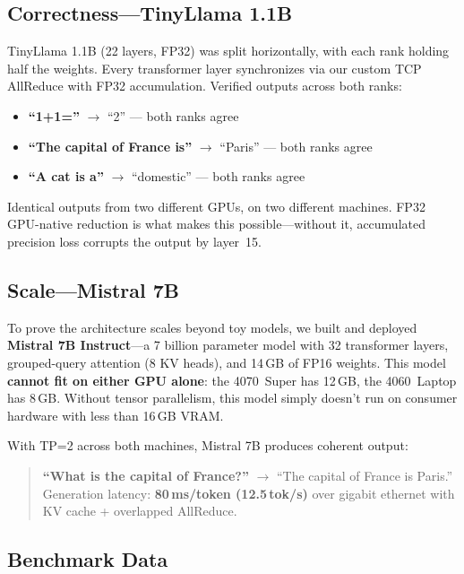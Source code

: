 \documentclass[10pt,twocolumn]{article}
\begin{document}
\subsection{Correctness---TinyLlama 1.1B}

TinyLlama 1.1B (22 layers, FP32) was split horizontally, with each rank
holding half the weights.  Every transformer layer synchronizes via our
custom TCP AllReduce with FP32 accumulation.  Verified outputs across both
ranks:

\begin{itemize}[nosep,leftmargin=*]
  \item \textbf{``1+1=''} $\rightarrow$ ``2'' --- both ranks agree \checkmark
  \item \textbf{``The capital of France is''} $\rightarrow$ ``Paris'' --- both ranks agree \checkmark
  \item \textbf{``A cat is a''} $\rightarrow$ ``domestic'' --- both ranks agree \checkmark
\end{itemize}

Identical outputs from two different GPUs, on two different machines.
FP32 GPU-native reduction is what makes this possible---without it,
accumulated precision loss corrupts the output by layer~15.

\subsection{Scale---Mistral 7B}

To prove the architecture scales beyond toy models, we built and deployed
\textbf{Mistral 7B Instruct}---a 7 billion parameter model with 32
transformer layers, grouped-query attention (8 KV heads), and 14\,GB of
FP16 weights.  This model \textbf{cannot fit on either GPU alone}: the
4070~Super has 12\,GB, the 4060~Laptop has 8\,GB.  Without tensor
parallelism, this model simply doesn't run on consumer hardware with less
than 16\,GB VRAM\@.

With TP=2 across both machines, Mistral 7B produces coherent output:

\begin{quote}
\textbf{``What is the capital of France?''} $\rightarrow$ ``The capital of
France is Paris.''\\
Generation latency: \textbf{80\,ms/token (12.5\,tok/s)} over gigabit
ethernet with KV cache + overlapped AllReduce.
\end{quote}

\subsection{Benchmark Data}
\end{document}
